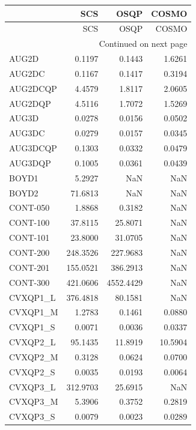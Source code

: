 \begin{longtable}{lrrr}
\toprule
{} &      SCS &      OSQP &   COSMO \\
\midrule
\endfirsthead

\toprule
{} &      SCS &      OSQP &   COSMO \\
\midrule
\endhead
\midrule
\multicolumn{4}{r}{{Continued on next page}} \\
\midrule
\endfoot

\bottomrule
\endlastfoot
AUG2D    &   0.1197 &    0.1443 &  1.6261 \\
AUG2DC   &   0.1167 &    0.1417 &  0.3194 \\
AUG2DCQP &   4.4579 &    1.8117 &  2.0605 \\
AUG2DQP  &   4.5116 &    1.7072 &  1.5269 \\
AUG3D    &   0.0278 &    0.0156 &  0.0502 \\
AUG3DC   &   0.0279 &    0.0157 &  0.0345 \\
AUG3DCQP &   0.1303 &    0.0332 &  0.0479 \\
AUG3DQP  &   0.1005 &    0.0361 &  0.0439 \\
BOYD1    &   5.2927 &       NaN &     NaN \\
BOYD2    &  71.6813 &       NaN &     NaN \\
CONT-050 &   1.8868 &    0.3182 &     NaN \\
CONT-100 &  37.8115 &   25.8071 &     NaN \\
CONT-101 &  23.8000 &   31.0705 &     NaN \\
CONT-200 & 248.3526 &  227.9683 &     NaN \\
CONT-201 & 155.0521 &  386.2913 &     NaN \\
CONT-300 & 421.0606 & 4552.4429 &     NaN \\
CVXQP1\_L & 376.4818 &   80.1581 &     NaN \\
CVXQP1\_M &   1.2783 &    0.1461 &  0.0880 \\
CVXQP1\_S &   0.0071 &    0.0036 &  0.0337 \\
CVXQP2\_L &  95.1435 &   11.8919 & 10.5904 \\
CVXQP2\_M &   0.3128 &    0.0624 &  0.0700 \\
CVXQP2\_S &   0.0035 &    0.0193 &  0.0064 \\
CVXQP3\_L & 312.9703 &   25.6915 &     NaN \\
CVXQP3\_M &   5.3906 &    0.3752 &  0.2819 \\
CVXQP3\_S &   0.0079 &    0.0023 &  0.0289 \\

\end{longtable}
